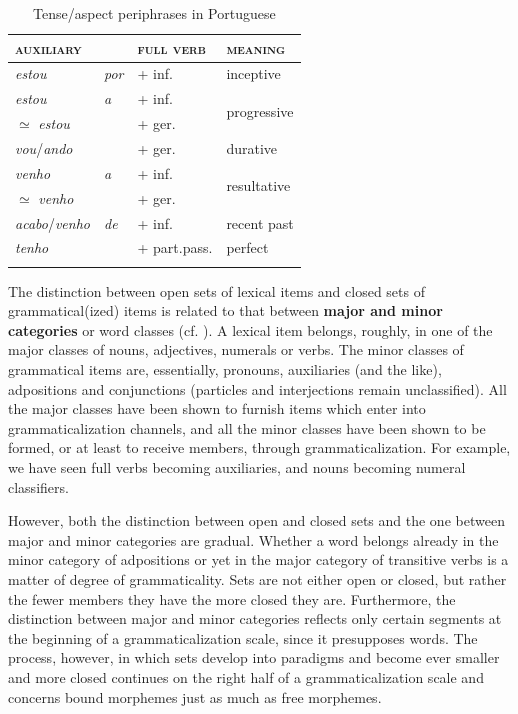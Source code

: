 \begin{table}
\begin{tabular}{llll}
\lsptoprule

\scshape auxiliary  & &  \scshape full verb & \scshape meaning\\
\midrule
\textit{estou} & \textit{por} & + inf. & inceptive\\
\textit{estou} & \textit{a} &  + inf. & \multirow{2}{*}{progressive}\\
${\simeq}$ \textit{estou} & & + ger. \\
\textit{vou}/\textit{ando}  & &  + ger. & durative\\
\textit{venho} & \textit{a} & + inf. & \multirow{2}{*}{resultative}\\
${\simeq}$ \textit{venho}  & &  + ger. \\
\textit{acabo}/\textit{venho} & \textit{de} & + inf. & recent past\\
\textit{tenho}  & & + part.pass. & perfect\\
\lspbottomrule
\end{tabular}
\caption{Tense/aspect periphrases in Portuguese}
\end{table}

The distinction between open sets of lexical items and closed sets of grammatical(ized) items is related to that between \textbf{major and minor categories} or word classes (cf. \citet[435f]{Lyons1968}). A lexical item belongs, roughly, in one of the major classes of nouns, adjectives, numerals or verbs. The minor classes of grammatical items are, essentially, pronouns, auxiliaries (and the like), adpositions and conjunctions (particles and interjections remain unclassified). All the major classes have been shown to furnish items which enter into grammaticalization channels, and all the minor classes have been shown to be formed, or at least to receive members, through grammaticalization. For example, we have seen full verbs becoming auxiliaries, and nouns becoming numeral classifiers.

However, both the distinction between open and closed sets and the one between major and minor categories are gradual. Whether a word belongs already in the minor category of adpositions or yet in the major category of transitive verbs is a matter of degree of grammaticality. Sets are not either open or closed, but rather the fewer members they have the more closed they are. Furthermore, the distinction between major and minor categories reflects only certain segments at the beginning of a grammaticalization scale, since it presupposes words. The process, however, in which sets develop into paradigms and become ever smaller and more closed continues on the right half of a grammaticalization scale and concerns bound morphemes just as much as free morphemes.

